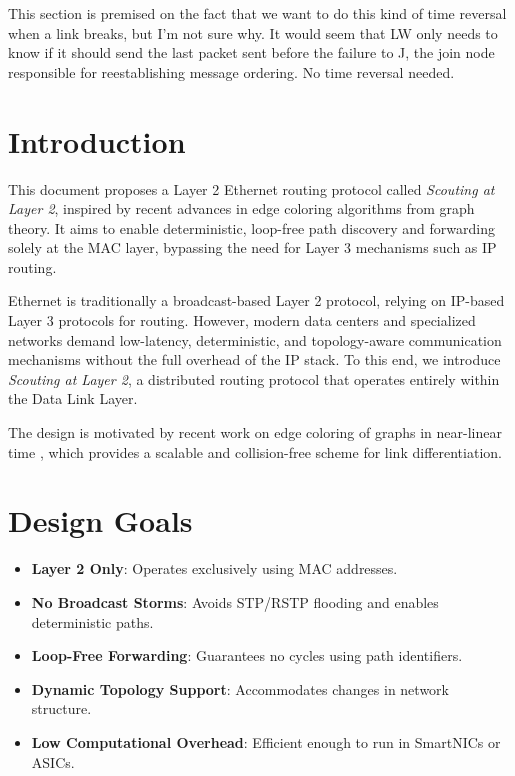 \documentclass[../OAE-SPEC-MAIN.tex]{subfiles}
\begin{document}
This section is premised on the fact that we want to do this kind of time reversal when a link breaks, but I'm not sure why.  It would seem that LW only needs to know if it should send the last packet sent before the failure to J, the join node responsible for reestablishing message ordering.  No time reversal needed.








\newpage


\section{Introduction}

This document proposes a Layer 2 Ethernet routing protocol called \emph{Scouting at Layer 2}, inspired by recent advances in edge coloring algorithms from graph theory. It aims to enable deterministic, loop-free path discovery and forwarding solely at the MAC layer, bypassing the need for Layer 3 mechanisms such as IP routing.

Ethernet is traditionally a broadcast-based Layer 2 protocol, relying on IP-based Layer 3 protocols for routing. However, modern data centers and specialized networks demand low-latency, deterministic, and topology-aware communication mechanisms without the full overhead of the IP stack. To this end, we introduce \emph{Scouting at Layer 2}, a distributed routing protocol that operates entirely within the Data Link Layer.

The design is motivated by recent work on edge coloring of graphs in near-linear time \cite{li2024vizing}, which provides a scalable and collision-free scheme for link differentiation.

\section{Design Goals}

\begin{itemize}[label=--]
    \item \textbf{Layer 2 Only}: Operates exclusively using MAC addresses.
    \item \textbf{No Broadcast Storms}: Avoids STP/RSTP flooding and enables deterministic paths.
    \item \textbf{Loop-Free Forwarding}: Guarantees no cycles using path identifiers.
    \item \textbf{Dynamic Topology Support}: Accommodates changes in network structure.
    \item \textbf{Low Computational Overhead}: Efficient enough to run in SmartNICs or ASICs.
\end{itemize}
\end{document}
